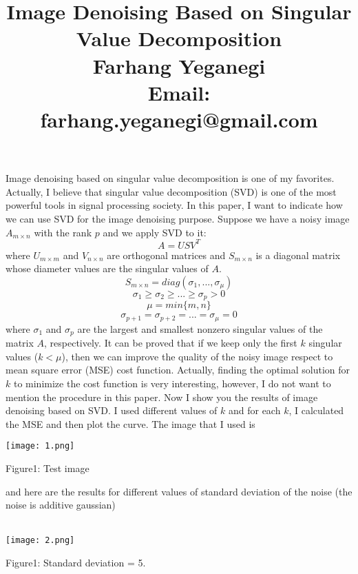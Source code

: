 \documentclass{article}
\title{Image Denoising Based on Singular Value Decomposition\\ Farhang Yeganegi\\ Email: farhang.yeganegi@gmail.com}
\date{}
\begin{document}
	\maketitle

Image denoising based on singular value decomposition is one of my favorites. Actually, I believe that singular value decomposition (SVD) is one of the most powerful tools in signal processing society. In this paper, I want to indicate how we can use SVD for the image denoising purpose. Suppose we have a noisy image $A_{m\times n}$ with the rank $p$ and we apply SVD to it:\\
\begin{equation}
A = USV^{T}
\end{equation}
where $U_{m\times m}$ and $V_{n\times n}$ are orthogonal matrices and $S_{m\times n}$ is a diagonal matrix whose diameter values are the singular values of $A$.
\[
S_{m\times n} = diag(\sigma_1,...,\sigma_{\mu})
\]
\begin{equation}
\sigma_1 \geq \sigma_2 \geq ... \geq \sigma_p>0
\end{equation}
\[
\mu = min\{m,n\}
\]
\[
\sigma_{p+1}=\sigma_{p+2}=...=\sigma_{\mu}=0
\]
where $\sigma_1$ and $\sigma_p$ are the largest and smallest nonzero singular values of the matrix $A$, respectively. It can be proved that if we keep only the first $k$ singular values ($k<\mu$), then we can improve the quality of the noisy image respect to mean square error (MSE) cost function. Actually, finding the optimal solution for $k$ to minimize the cost function is very interesting, however, I do not want to mention the procedure in this paper. Now I show you the results of image denoising based on SVD. I used different values of $k$ and for each $k$, I calculated the MSE and then plot the curve. The image that I used is\\
\begin{center}
\texttt{[image: 1.png]}
\end{center}
\begin{center}
Figure1: Test image
\end{center}
and here are the results for different values of standard deviation of the noise (the noise is additive gaussian)\\
\\
\begin{center}
\texttt{[image: 2.png]}
\end{center}
\begin{center}
Figure1: Standard deviation = 5.
\end{center}
\end{document}
